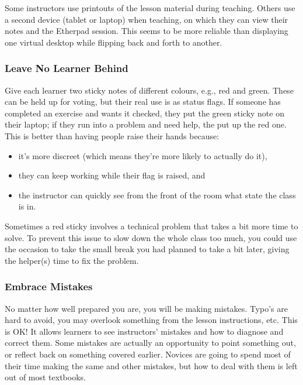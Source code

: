 Some instructors use printouts of the lesson material during teaching.
Others use a second device (tablet or laptop) when teaching, on which
they can view their notes and the Etherpad session.  This seems to be
more reliable than displaying one virtual desktop while flipping back
and forth to another.

\subsubsection*{Leave No Learner Behind}

Give each learner two sticky notes of different colours, e.g., red and
green.  These can be held up for voting, but their real use is as
status flags.  If someone has completed an exercise and wants it
checked, they put the green sticky note on their laptop; if they run
into a problem and need help, the put up the red one.  This is better
than having people raise their hands because:

\begin{itemize}
\item it's more discreet (which means they're more likely to actually do it),
\item they can keep working while their flag is raised, and
\item the instructor can quickly see from the front of the room what state the class is in.
\end{itemize}

Sometimes a red sticky involves a technical problem that takes a bit
more time to solve.  To prevent this issue to slow down the whole
class too much, you could use the occasion to take the small break you
had planned to take a bit later, giving the helper(s) time to fix the
problem.

\subsubsection*{Embrace Mistakes}

No matter how well prepared you are, you will be making mistakes.
Typo's are hard to avoid, you may overlook something from the lesson
instructions, etc.  This is OK! It allows learners to see instructors'
mistakes and how to diagnose and correct them.  Some mistakes are
actually an opportunity to point something out, or reflect back on
something covered earlier.  Novices are going to spend most of their
time making the same and other mistakes, but how to deal with them is
left out of most textbooks.

